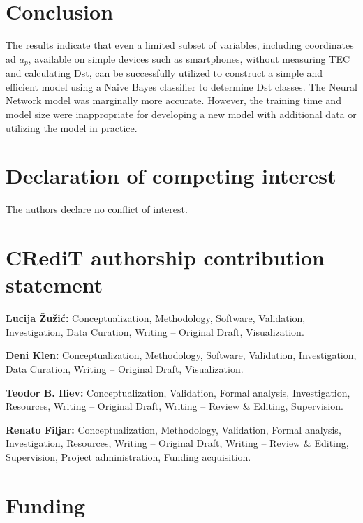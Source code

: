 \documentclass[preprint,12pt]{elsarticle}
\begin{document}
\section{Conclusion}

The results indicate that even a limited subset of variables, including coordinates ad $a_{p}$, available on simple devices such as smartphones, without measuring TEC and calculating Dst, can be successfully utilized to construct a simple and efficient model using a Naive Bayes classifier to determine Dst classes. The Neural Network model was marginally more accurate. However, the training time and model size were inappropriate for developing a new model with additional data or utilizing the model in practice.


\section*{Declaration of competing interest}

The authors declare no conflict of interest.

\section*{CRediT authorship contribution statement}

\textbf{Lucija \v{Z}u\v{z}i\'{c}:} Conceptualization, Methodology, Software, Validation, Investigation, Data Curation, Writing -- Original Draft, Visualization. 

\textbf{Deni Klen:} Conceptualization, Methodology, Software, Validation, Investigation, Data Curation, Writing -- Original Draft, Visualization. 

\textbf{Teodor B. Iliev:} Conceptualization,  Validation, Formal analysis, Investigation, Resources, Writing -- Original Draft, Writing -- Review \& Editing, Supervision. 

\textbf{Renato Filjar:} Conceptualization, Methodology, Validation, Formal analysis, Investigation, Resources, Writing -- Original Draft, Writing -- Review \& Editing, Supervision, Project administration, Funding acquisition.


\section*{Funding}
\end{document}
